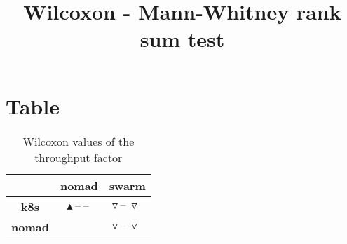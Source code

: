 \documentclass{article}
\title{Wilcoxon - Mann-Whitney rank sum test}
\author{}
\begin{document}
\maketitle
\section{Table}
\begin{table}[!htp]
  \caption{Wilcoxon values of the throughput factor}
  \label{table:throughput}
  \centering
  \begin{scriptsize}
  \begin{tabular}{c|cc}
      & \textbf{nomad} & \textbf{swarm} \\\hline
      \textbf{k8s} & $\blacktriangle\ \text{--}\ \text{--}\  $ & $ \triangledown\ \text{--}\ \triangledown\ $ \\
      \textbf{nomad} & $ $ & $ \triangledown\ \text{--}\ \triangledown\ $ \\
  \end{tabular}
  \end{scriptsize}
\end{table}
\end{document}
